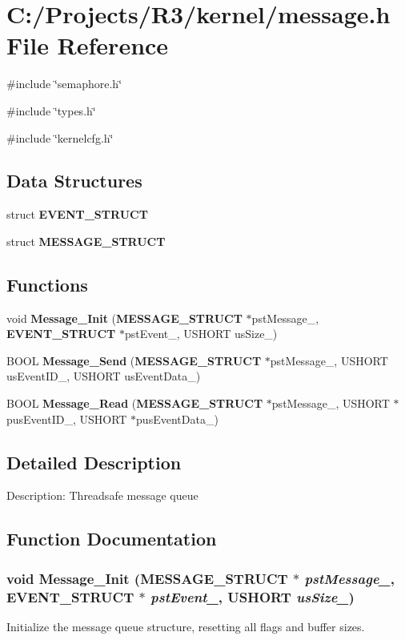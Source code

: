 \section{C:/Projects/R3/kernel/message.h File Reference}
\label{message_8h}
{\ttfamily \#include \char`\"{}semaphore.h\char`\"{}}\par
{\ttfamily \#include \char`\"{}types.h\char`\"{}}\par
{\ttfamily \#include \char`\"{}kernelcfg.h\char`\"{}}\par
\subsection*{Data Structures}
\begin{DoxyCompactItemize}
\item 
struct {\bf EVENT\_\-STRUCT}
\item 
struct {\bf MESSAGE\_\-STRUCT}
\end{DoxyCompactItemize}
\subsection*{Functions}
\begin{DoxyCompactItemize}
\item 
void {\bf Message\_\-Init} ({\bf MESSAGE\_\-STRUCT} $\ast$pstMessage\_\-, {\bf EVENT\_\-STRUCT} $\ast$pstEvent\_\-, USHORT usSize\_\-)
\item 
BOOL {\bf Message\_\-Send} ({\bf MESSAGE\_\-STRUCT} $\ast$pstMessage\_\-, USHORT usEventID\_\-, USHORT usEventData\_\-)
\item 
BOOL {\bf Message\_\-Read} ({\bf MESSAGE\_\-STRUCT} $\ast$pstMessage\_\-, USHORT $\ast$pusEventID\_\-, USHORT $\ast$pusEventData\_\-)
\end{DoxyCompactItemize}


\subsection{Detailed Description}
Description: Threadsafe message queue 

\subsection{Function Documentation}
\subsubsection[{Message\_\-Init}]{\setlength{\rightskip}{0pt plus 5cm}void Message\_\-Init ({\bf MESSAGE\_\-STRUCT} $\ast$ {\em pstMessage\_\-}, \/  {\bf EVENT\_\-STRUCT} $\ast$ {\em pstEvent\_\-}, \/  USHORT {\em usSize\_\-})}\label{message_8h_aa46631cdd516a3af7b515fb3d34872c8}
Initialize the message queue structure, resetting all flags and buffer sizes.


